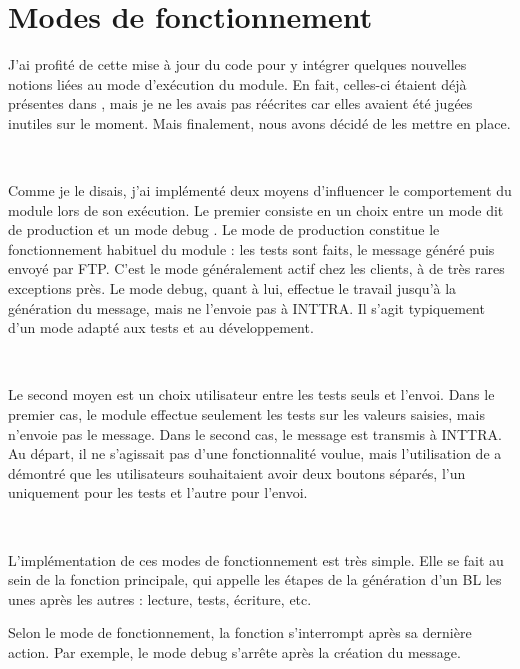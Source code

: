 \section{Modes de fonctionnement}
J'ai profité de cette mise à jour du code pour y intégrer quelques nouvelles notions liées au mode d'exécution du module. En fait, celles-ci étaient déjà présentes dans \pireus, mais je ne les avais pas réécrites car elles avaient été jugées inutiles sur le moment. Mais finalement, nous avons décidé de les mettre en place.

~

Comme je le disais, j'ai implémenté deux moyens d'influencer le comportement du module lors de son exécution. Le premier consiste en un choix entre un mode dit \og de production \fg{} et un mode \og debug \fg. Le mode de production constitue le fonctionnement habituel du module : les tests sont faits, le message généré puis envoyé par FTP. C'est le mode généralement actif chez les clients, à de très rares exceptions près. Le mode debug, quant à lui, effectue le travail jusqu'à la génération du message, mais ne l'envoie pas à INTTRA. Il s'agit typiquement d'un mode adapté aux tests et au développement.

~

Le second moyen est un choix utilisateur entre les tests seuls et l'envoi. Dans le premier cas, le module effectue seulement les tests sur les valeurs saisies, mais n’envoie pas le message. Dans le second cas, le message est transmis à INTTRA. Au départ, il ne s'agissait pas d'une fonctionnalité voulue, mais l'utilisation de \pireus{} a démontré que les utilisateurs souhaitaient avoir deux boutons séparés, l'un uniquement pour les tests et l'autre pour l'envoi.

~

L'implémentation de ces modes de fonctionnement est très simple. Elle se fait au sein de la fonction principale, qui appelle les étapes de la génération d'un BL les unes après les autres : lecture, tests, écriture, etc.

Selon le mode de fonctionnement, la fonction s'interrompt après sa dernière action. Par exemple, le mode debug s'arrête après la création du message.